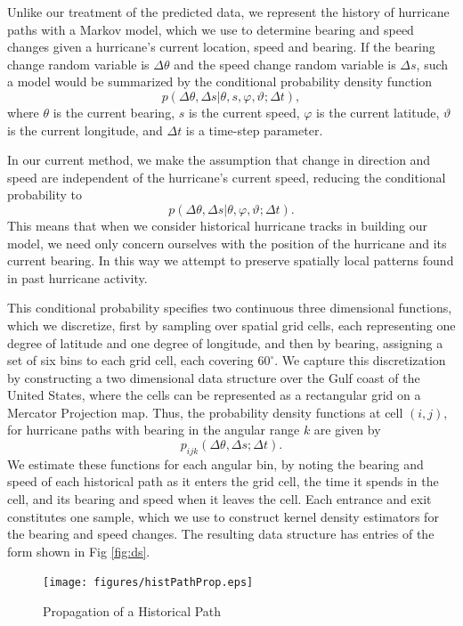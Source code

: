 \documentclass[journal]{vgtc}                %
\begin{document}
Unlike our treatment of the predicted data, we represent the history of hurricane paths with a Markov model, which
we use to determine bearing and speed changes given a hurricane's current location, speed and bearing.
If the bearing change random variable is $\Delta\theta$ and the speed change random variable is $\Delta s$,
such a model would be summarized by the conditional probability density function
\[
  p(\Delta\theta, \Delta s | \theta, s, \varphi, \vartheta; \Delta t),
\]
where $\theta$ is the current bearing, $s$ is the current speed, $\varphi$ is the current latitude, $\vartheta$ is the current longitude, and $\Delta t$ is a time-step parameter.

In our current method, we make the assumption that change in direction and speed are independent of the
hurricane's current speed, reducing the conditional probability to
\[
  p(\Delta\theta, \Delta s | \theta, \varphi, \vartheta; \Delta t).
\]
This means that when we consider historical hurricane tracks in building our model, we need only concern
ourselves with the position of the hurricane and its current bearing.
In this way we attempt to preserve spatially local patterns found in past hurricane activity.

This conditional probability specifies two continuous three dimensional functions, which we discretize, first by sampling over spatial grid cells, each representing one degree of latitude and one degree of longitude, and then by bearing, assigning a set of six bins to each grid cell, each covering $60^\circ$. We capture this discretization by constructing a two dimensional data structure over the Gulf coast of the United States, where the cells can be represented as a rectangular grid on a Mercator Projection map. Thus, the probability density functions at cell $(i, j)$, for hurricane paths with bearing in the angular range $k$ are given by
\[
 p_{ijk}(\Delta\theta, \Delta s; \Delta t).
\]
We estimate these functions for each angular bin, by noting the bearing and speed of each historical path as it enters the grid cell, the time it spends in the cell, and its bearing and speed when it leaves the cell. Each entrance and exit constitutes one sample, which we use to construct kernel density estimators for the bearing
and speed changes. The resulting data structure has entries of the form shown in Fig \ref{fig:ds}.

\begin{figure}
 \centering
 \texttt{[image: figures/histPathProp.eps]}
 \caption{Propagation of a Historical Path}
 \label{fig:pathProp}
\end{figure}
\end{document}
